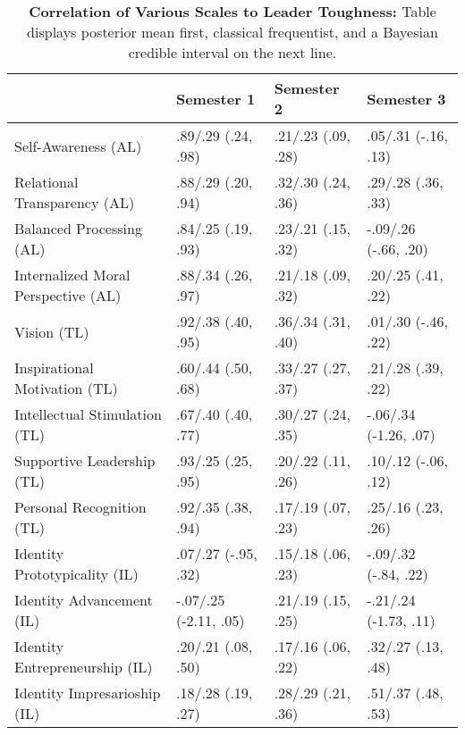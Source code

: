 \begin{table}[ht]
\centering
\begin{tabular}{llll}
  \hline
 & Semester 1 & Semester 2 & Semester 3 \\ 
  \hline
Self-Awareness (AL) & .89/.29 (.24, .98) & .21/.23 (.09, .28) & .05/.31 (-.16, .13) \\ 
  Relational Transparency (AL) & .88/.29 (.20, .94) & .32/.30 (.24, .36) & .29/.28 (.36, .33) \\ 
  Balanced Processing (AL) & .84/.25 (.19, .93) & .23/.21 (.15, .32) & -.09/.26 (-.66, .20) \\ 
  Internalized Moral Perspective (AL) & .88/.34 (.26, .97) & .21/.18 (.09, .32) & .20/.25 (.41, .22) \\ 
  Vision (TL) & .92/.38 (.40, .95) & .36/.34 (.31, .40) & .01/.30 (-.46, .22) \\ 
  Inspirational Motivation (TL) & .60/.44 (.50, .68) & .33/.27 (.27, .37) & .21/.28 (.39, .22) \\ 
  Intellectual Stimulation (TL) & .67/.40 (.40, .77) & .30/.27 (.24, .35) & -.06/.34 (-1.26, .07) \\ 
  Supportive Leadership (TL) & .93/.25 (.25, .95) & .20/.22 (.11, .26) & .10/.12 (-.06, .12) \\ 
  Personal Recognition (TL) & .92/.35 (.38, .94) & .17/.19 (.07, .23) & .25/.16 (.23, .26) \\ 
  Identity Prototypicality (IL) & .07/.27 (-.95, .32) & .15/.18 (.06, .23) & -.09/.32 (-.84, .22) \\ 
  Identity Advancement (IL) & -.07/.25 (-2.11, .05) & .21/.19 (.15, .25) & -.21/.24 (-1.73, .11) \\ 
  Identity Entrepreneurship (IL) & .20/.21 (.08, .50) & .17/.16 (.06, .22) & .32/.27 (.13, .48) \\ 
  Identity Impresarioship (IL) & .18/.28 (.19, .27) & .28/.29 (.21, .36) & .51/.37 (.48, .53) \\ 
   \hline
\end{tabular}
\caption{\textbf{Correlation of Various Scales to Leader Toughness:} Table displays posterior mean first, classical frequentist, and a Bayesian credible interval on the next line.} 
\label{tab:lead_corr}
\end{table}
